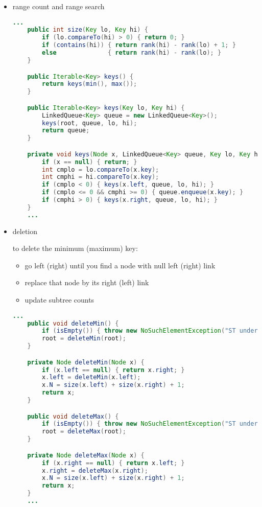 \documentclass[8pt,a4paper,compress]{beamer}
\begin{document}
\begin{frame}[fragile]
\begin{itemize}
\item range count and range search
\begin{lstlisting}[language=Java]
    ...
    public int size(Key lo, Key hi) {
        if (lo.compareTo(hi) > 0) { return 0; }
        if (contains(hi)) { return rank(hi) - rank(lo) + 1; }
        else              { return rank(hi) - rank(lo); }
    }

    public Iterable<Key> keys() {
        return keys(min(), max());
    }

    public Iterable<Key> keys(Key lo, Key hi) {
        LinkedQueue<Key> queue = new LinkedQueue<Key>();
        keys(root, queue, lo, hi);
        return queue;
    } 

    private void keys(Node x, LinkedQueue<Key> queue, Key lo, Key hi) { 
        if (x == null) { return; }
        int cmplo = lo.compareTo(x.key); 
        int cmphi = hi.compareTo(x.key); 
        if (cmplo < 0) { keys(x.left, queue, lo, hi); } 
        if (cmplo <= 0 && cmphi >= 0) { queue.enqueue(x.key); }
        if (cmphi > 0) { keys(x.right, queue, lo, hi); }
    } 
    ...
\end{lstlisting}
\end{itemize}
\end{frame}

\begin{frame}[fragile]
\begin{itemize}
\item deletion

\smallskip

to delete the minimum (maximum) key:
\begin{itemize}
\item go left (right) until you find a node with null left (right) link

\item replace that node by its right (left) link

\item update subtree counts

\end{itemize}
\begin{lstlisting}[language=Java]
    ...
    public void deleteMin() {
        if (isEmpty()) { throw new NoSuchElementException("ST underflow"); }
        root = deleteMin(root);
    }

    private Node deleteMin(Node x) {
        if (x.left == null) { return x.right; }
        x.left = deleteMin(x.left);
        x.N = size(x.left) + size(x.right) + 1; 
        return x;
    }

    public void deleteMax() {
        if (isEmpty()) { throw new NoSuchElementException("ST underflow"); }
        root = deleteMax(root);
    }

    private Node deleteMax(Node x) {
        if (x.right == null) { return x.left; }
        x.right = deleteMax(x.right);
        x.N = size(x.left) + size(x.right) + 1;
        return x;
    }   
    ...
\end{lstlisting}
\end{itemize}
\end{frame}
\end{document}
